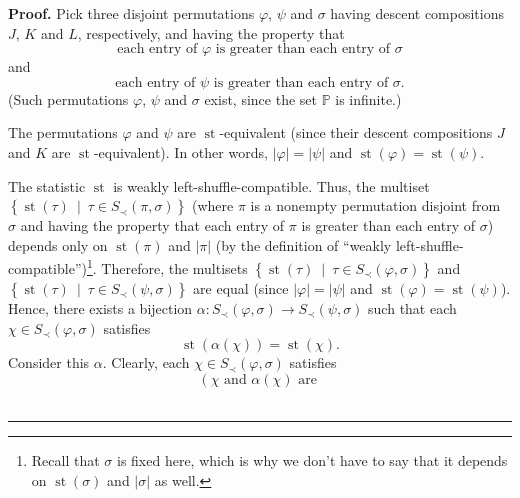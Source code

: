 \documentclass[numbers=enddot,12pt,final,onecolumn,notitlepage]{scrartcl}%
\theoremstyle{definition}
\newenvironment{proof}[1][Proof]{\noindent\textbf{#1.} }{\ \rule{0.5em}{0.5em}}
\begin{document}
\begin{proof}
Pick three disjoint permutations $\varphi$, $\psi$ and $\sigma$ having descent
compositions $J$, $K$ and $L$, respectively, and having the property that%
\[
\text{each entry of }\varphi\text{ is greater than each entry of }\sigma
\]
and%
\[
\text{each entry of }\psi\text{ is greater than each entry of }\sigma\text{.}%
\]
(Such permutations $\varphi$, $\psi$ and $\sigma$ exist, since the set
$\mathbb{P}$ is infinite.)

The permutations $\varphi$ and $\psi$ are $\operatorname*{st}$-equivalent
(since their descent compositions $J$ and $K$ are $\operatorname*{st}%
$-equivalent). In other words, $\left\vert \varphi\right\vert =\left\vert
\psi\right\vert $ and $\operatorname*{st}\left(  \varphi\right)
=\operatorname*{st}\left(  \psi\right)  $.

The statistic $\operatorname*{st}$ is weakly left-shuffle-compatible. Thus,
the multiset $\left\{  \operatorname*{st}\left(  \tau\right)  \ \mid\ \tau\in
S_{\prec}\left(  \pi,\sigma\right)  \right\}  $ (where $\pi$ is a nonempty
permutation disjoint from $\sigma$ and having the property that each entry of
$\pi$ is greater than each entry of $\sigma$) depends only on
$\operatorname*{st}\left(  \pi\right)  $ and $\left\vert \pi\right\vert $ (by
the definition of \textquotedblleft weakly
left-shuffle-compatible\textquotedblright)\footnote{Recall that $\sigma$ is
fixed here, which is why we don't have to say that it depends on
$\operatorname*{st}\left(  \sigma\right)  $ and $\left\vert \sigma\right\vert
$ as well.}. Therefore, the multisets $\left\{  \operatorname*{st}\left(
\tau\right)  \ \mid\ \tau\in S_{\prec}\left(  \varphi,\sigma\right)  \right\}
$ and $\left\{  \operatorname*{st}\left(  \tau\right)  \ \mid\ \tau\in
S_{\prec}\left(  \psi,\sigma\right)  \right\}  $ are equal (since $\left\vert
\varphi\right\vert =\left\vert \psi\right\vert $ and $\operatorname*{st}%
\left(  \varphi\right)  =\operatorname*{st}\left(  \psi\right)  $). Hence,
there exists a bijection $\alpha:S_{\prec}\left(  \varphi,\sigma\right)
\rightarrow S_{\prec}\left(  \psi,\sigma\right)  $ such that each $\chi\in
S_{\prec}\left(  \varphi,\sigma\right)  $ satisfies%
\begin{equation}
\operatorname*{st}\left(  \alpha\left(  \chi\right)  \right)
=\operatorname*{st}\left(  \chi\right)  . \label{pf.thm.dendri.K.ideal.alpha}%
\end{equation}
Consider this $\alpha$. Clearly, each $\chi\in S_{\prec}\left(  \varphi
,\sigma\right)  $ satisfies%
\[
\left(  \chi\text{ and }\alpha\left(  \chi\right)  \text{ are }%
\]
\end{proof}
\end{document}
